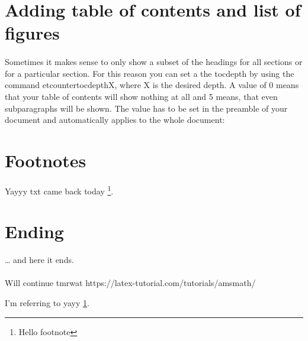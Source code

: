 \documentclass[a4paper, 12pt]{article}
\begin{document}
\section {Adding table of contents and list of figures}

\paragraph{}  Sometimes it makes sense to only show a subset of the headings for all sections or for a particular section. For this reason you can set a the tocdepth by using the command etcounter{tocdepth}{X}, where X is the desired depth. A value of 0 means that your table of contents will show nothing at all and 5 means, that even subparagraphs will be shown. The value has to be set in the preamble of your document and automatically applies to the whole document:


\section{Footnotes}
Yayyy txt came back today \footnote{\label{myfootnote}Hello footnote}.


\section{Ending}
\ldots{} and here it ends.

\paragraph{} 
Will continue tmrwat https://latex-tutorial.com/tutorials/amsmath/



I'm referring to yayy \ref{myfootnote}.

\begin{appendix}
  \listoffigures

\end{appendix}
\end{document}
